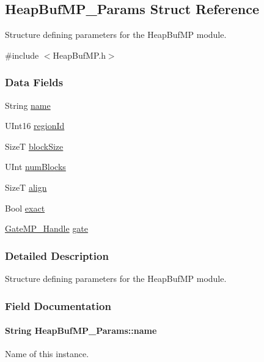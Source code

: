 \subsection{HeapBufMP\_\-Params Struct Reference}
\label{struct_heap_buf_m_p___params}


Structure defining parameters for the HeapBufMP module.  




{\ttfamily \#include $<$HeapBufMP.h$>$}

\subsubsection*{Data Fields}
\begin{DoxyCompactItemize}
\item 
String \hyperlink{struct_heap_buf_m_p___params_aaefdf87660dc3b0a57d33f10791dcc02}{name}
\item 
UInt16 \hyperlink{struct_heap_buf_m_p___params_a22f33c326f94898613b8d40335be4eee}{regionId}
\item 
SizeT \hyperlink{struct_heap_buf_m_p___params_afc5038de12c1e9bf75d642c1081b74ac}{blockSize}
\item 
UInt \hyperlink{struct_heap_buf_m_p___params_a4e85da751892052ed1fddc3376f64d9d}{numBlocks}
\item 
SizeT \hyperlink{struct_heap_buf_m_p___params_a0b16778e64598aca34ee44c746374203}{align}
\item 
Bool \hyperlink{struct_heap_buf_m_p___params_a1ebbb52b6985282c23f534da4ac27eaa}{exact}
\item 
\hyperlink{_gate_m_p_8h_ad5bb259f928a14e98d973334bc60ebb3}{GateMP\_\-Handle} \hyperlink{struct_heap_buf_m_p___params_a3b1ef95defb6c91953bd53050489644e}{gate}
\end{DoxyCompactItemize}


\subsubsection{Detailed Description}
Structure defining parameters for the HeapBufMP module. 

\subsubsection{Field Documentation}
\paragraph[{name}]{\setlength{\rightskip}{0pt plus 5cm}String {\bf HeapBufMP\_\-Params::name}}\hfill\label{struct_heap_buf_m_p___params_aaefdf87660dc3b0a57d33f10791dcc02}
Name of this instance.


